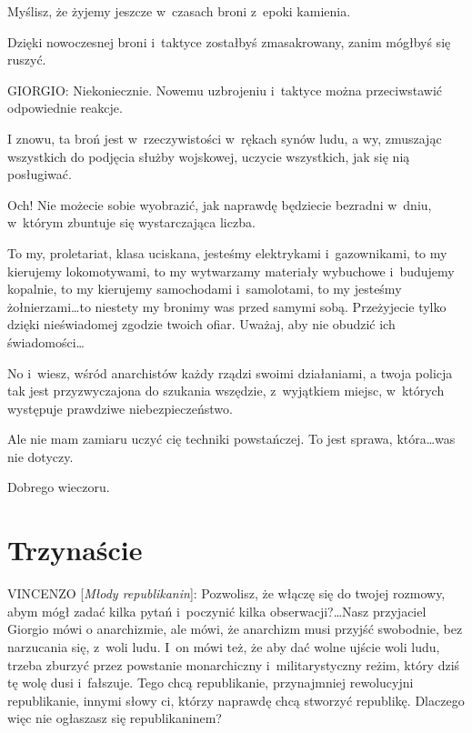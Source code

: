 \documentclass[oneside,polish,11pt,sfheadings]{mwbk}
\begin{document}
 
Myślisz, że żyjemy jeszcze w~czasach broni z~epoki kamienia. 

 
Dzięki nowoczesnej broni i~taktyce zostałbyś zmasakrowany, zanim mógłbyś się ruszyć. 




 
\noindent GIORGIO: Niekoniecznie. Nowemu uzbrojeniu i~taktyce można przeciwstawić odpowiednie reakcje. 

 
I znowu, ta broń jest w~rzeczywistości w~rękach synów ludu, a wy, zmuszając wszystkich do podjęcia służby wojskowej,
uczycie wszystkich, jak się nią posługiwać. 

 
Och! Nie możecie sobie wyobrazić, jak naprawdę będziecie bezradni w~dniu, w~którym zbuntuje się wystarczająca liczba. 

 
To my, proletariat, klasa uciskana, jesteśmy elektrykami i~gazownikami, to my kierujemy lokomotywami, to my wytwarzamy
materiały wybuchowe i~budujemy kopalnie, to my kierujemy samochodami i~samolotami, to my jesteśmy żołnierzami\ldots to
niestety my bronimy was przed samymi sobą. Przeżyjecie tylko dzięki nieświadomej zgodzie twoich ofiar. Uważaj, aby nie
obudzić ich świadomości\ldots 

 
No i~wiesz, wśród anarchistów każdy rządzi swoimi działaniami, a twoja policja tak jest przyzwyczajona do szukania
wszędzie, z~wyjątkiem miejsc, w~których występuje prawdziwe niebezpieczeństwo. 

 
Ale nie mam zamiaru uczyć cię techniki powstańczej. To jest sprawa, która\ldots was nie dotyczy. 

 
Dobrego wieczoru. 










\chapter*{Trzynaście}



 
\noindent VINCENZO [\textit{Młody republikanin}]: Pozwolisz, że włączę się do twojej rozmowy, abym mógł zadać kilka pytań i~poczynić kilka obserwacji?\ldots Nasz przyjaciel Giorgio mówi o anarchizmie, ale mówi, że anarchizm musi przyjść
swobodnie, bez narzucania się, z~woli ludu. I~on mówi też, że aby dać wolne ujście woli ludu, trzeba zburzyć przez
powstanie monarchiczny i~militarystyczny reżim, który dziś tę wolę dusi i~fałszuje. Tego chcą republikanie,
przynajmniej rewolucyjni republikanie, innymi słowy ci, którzy naprawdę chcą stworzyć republikę. Dlaczego więc nie
ogłaszasz się republikaninem? 
\end{document}
